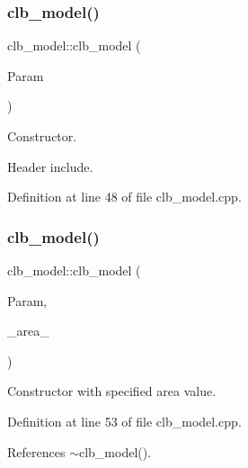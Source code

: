 \subsubsection{\texorpdfstring{clb\+\_\+model()}{clb\_model()}\hspace{0.1cm}{\footnotesize\ttfamily [1/2]}}
{\footnotesize\ttfamily clb\+\_\+model\+::clb\+\_\+model (\begin{DoxyParamCaption}\item[{const \hyperlink{Parameter_8hpp_a37841774a6fcb479b597fdf8955eb4ea}{Parameter\+Const\+Ref} \&}]{Param }\end{DoxyParamCaption})\hspace{0.3cm}{\ttfamily [explicit]}}



Constructor. 

Header include. 

Definition at line 48 of file clb\+\_\+model.\+cpp.

\mbox{\label{classclb__model_a0059d23bad0d3edef661789073b3d0ea}} 
\subsubsection{\texorpdfstring{clb\+\_\+model()}{clb\_model()}\hspace{0.1cm}{\footnotesize\ttfamily [2/2]}}
{\footnotesize\ttfamily clb\+\_\+model\+::clb\+\_\+model (\begin{DoxyParamCaption}\item[{const \hyperlink{Parameter_8hpp_a37841774a6fcb479b597fdf8955eb4ea}{Parameter\+Const\+Ref} \&}]{Param,  }\item[{const double \&}]{\+\_\+area\+\_\+ }\end{DoxyParamCaption})}



Constructor with specified area value. 



Definition at line 53 of file clb\+\_\+model.\+cpp.



References $\sim$clb\+\_\+model().

